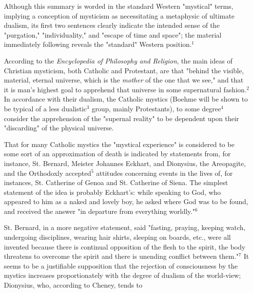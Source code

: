 {}

Although this summary is worded in the standard Western "mystical"
terms, implying a conception of mysticism as necessitating
a metaphysic of ultimate dualism, its first two sentences
clearly indicate the intended sense of the "purgation,"
"individuality," and "escape of time and space"; the material
immediately following reveals the "standard" Western position.$^{1}$\par
\vspace*{0.5\baselineskip}
According to the \textit{Encyclopedia of Philosophy and Religion},
the main ideas of Christian mysticism, both Catholic and
Protestant, are that "behind the visible, material, eternal universe,
which is the \textit{mother} of the one that we see," and that it is
man's highest goal to apprehend that universe in some supernatural
fashion.$^{2}$ In accordance with their dualism, the
Catholic mystics (Boehme will be shown to be typical of a
less dualistic$^{3}$ group, mainly Protestants), to some degree$^{4}$
consider the apprehension of the "supernal reality" to be
dependent upon their "discarding" of the physical universe.\par
\vspace*{0.5\baselineskip}
That for many Catholic mystics the "mystical experience"
is considered to be some sort of an approximation of death
is indicated by statements from, for instance, St. Bernard,
Meister Johannes Eckhart, and Dionysius, the Areopagite, and
the Orthodoxly accepted$^{5}$ attitudes concerning events in the
lives of, for instances, St. Catherine of Genoa and St. Catherine
of Siena. The simplest statement of the idea is probably
Eckhart's: while speaking to God, who appeared to him as a
naked and lovely boy, he asked where God was to be found, and
received the answer "in departure from everything worldly."$^{6}$\par
\vspace*{0.5\baselineskip}
St. Bernard, in a more negative statement, said "fasting,
praying, keeping watch, undergoing disciplines, wearing hair
shirts, sleeping on boards, etc., were all invented because
there is continual opposition of the flesh to the spirit,
the body threatens to overcome the spirit and there is unending
conflict between them."$^{7}$ It seems to be a justifiable
supposition that the rejection of consciousness by the mystics
increases proportionately with the degree of dualism of the
world-view; Dionysius, who, according to Cheney, tends to

